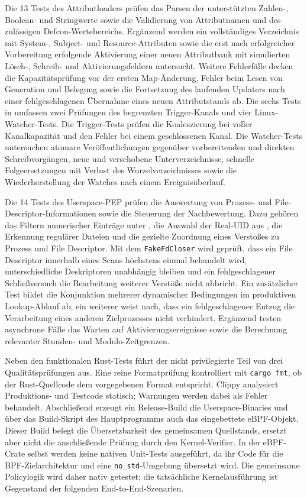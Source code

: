 Die 13 Tests des Attributloaders prüfen das Parsen der unterstützten Zahlen-, Boolean- und
Stringwerte sowie die Validierung von Attributnamen und des zulässigen Defcon-Wertebereichs.
Ergänzend werden ein vollständiges Verzeichnis mit System-, Subject- und Resource-Attributen sowie
die erst nach erfolgreicher Vorbereitung erfolgende Aktivierung einer neuen Attributbank mit simulierten Lösch-, Schreib- und
Aktivierungsfehlern untersucht. Weitere Fehlerfälle decken die Kapazitätsprüfung vor der ersten
Map-Änderung, Fehler beim Lesen von Generation und Belegung sowie die Fortsetzung des laufenden
Updaters nach einer fehlgeschlagenen Übernahme eines neuen Attributstands ab.
Die sechs Tests in  umfassen zwei Prüfungen des begrenzten
Trigger-Kanals und vier Linux-Watcher-Tests. Die Trigger-Tests prüfen die Koaleszierung bei voller
Kanalkapazität und den Fehler bei einem geschlossenen Kanal. Die Watcher-Tests untersuchen
atomare Veröffentlichungen gegenüber vorbereitenden und direkten Schreibvorgängen, neue und
verschobene Unterverzeichnisse, schnelle Folgeersetzungen mit Verlust des Wurzelverzeichnisses
sowie die Wiederherstellung der Watches nach einem Ereignisüberlauf.

Die 14 Tests des Userspace-PEP prüfen die Auswertung von Prozess- und
File-Descriptor-Informationen sowie die Steuerung der Nachbewertung. Dazu gehören das Filtern
numerischer Einträge unter , die Auswahl der Real-UID aus
\mbox{}, die Erkennung regulärer Dateien und die gezielte Zuordnung eines
Verstoßes zu Prozess und File Descriptor. Mit dem \texttt{FakeFdCloser} wird geprüft, dass ein
File Descriptor innerhalb eines Scans höchstens einmal behandelt wird, unterschiedliche
Deskriptoren unabhängig bleiben und ein fehlgeschlagener Schließversuch die Bearbeitung weiterer
Verstöße nicht abbricht. Ein zusätzlicher Test bildet die Konjunktion mehrerer dynamischer
Bedingungen im produktiven Lookup-Ablauf ab; ein weiterer weist nach, dass ein fehlgeschlagener
Entzug die Verarbeitung eines anderen Zielprozesses nicht verhindert. Ergänzend testen asynchrone
Fälle das Warten auf Aktivierungsereignisse sowie die Berechnung relevanter Stunden- und
Modulo-Zeitgrenzen.

Neben den funktionalen Rust-Tests führt der nicht privilegierte Teil von  drei
Qualitätsprüfungen aus. Eine reine
Formatprüfung kontrolliert mit \texttt{cargo fmt}, ob der Rust-Quellcode dem vorgegebenen Format
entspricht. Clippy analysiert Produktions- und Testcode statisch; Warnungen werden dabei als
Fehler behandelt. Abschließend erzeugt ein Release-Build die Userspace-Binaries und über das
Build-Skript des Hauptprogramms auch das eingebettete eBPF-Objekt. Dieser Build belegt die
Übersetzbarkeit des gemeinsamen Quellstands, ersetzt aber nicht die anschließende Prüfung durch
den Kernel-Verifier. In der eBPF-Crate selbst werden keine nativen Unit-Tests ausgeführt, da ihr
Code für die BPF-Zielarchitektur und eine \texttt{no\_std}-Umgebung übersetzt wird. Die
gemeinsame Policylogik wird daher nativ getestet; die tatsächliche Kernelausführung ist
Gegenstand der folgenden End-to-End-Szenarien.

